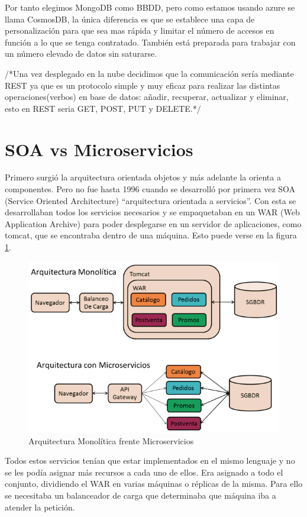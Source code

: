\documentclass[12pt]{report} %
\begin{document}
Por tanto elegimos MongoDB como BBDD, pero como estamos usando azure se llama CosmosDB, la única diferencia es que se establece una capa de personalización para que sea mas rápida y limitar el número de accesos en función a lo que se tenga contratado. También está preparada para trabajar con un número elevado de datos sin saturarse.




/*Una vez desplegado en la nube decidimos que la comunicación sería mediante REST ya que es un protocolo simple y muy eficaz para realizar las distintas operaciones(verbos) en base de datos: añadir, recuperar, actualizar y eliminar, esto en REST seria GET, POST, PUT y DELETE.*/


\section{SOA vs Microservicios}

Primero surgió la arquitectura orientada objetos y más adelante la orienta a componentes. Pero no fue hasta 1996 cuando se desarrolló por primera vez SOA (Service Oriented Architecture) “arquitectura orientada a servicios”. Con esta se desarrollaban todos los servicios necesarios y se empaquetaban en un WAR (Web Application Archive) para poder desplegarse en un servidor de aplicaciones, como tomcat, que se encontraba dentro de una máquina. Esto puede verse en la figura \ref{fig:soavsmicroservicios}.

\begin{figure}
	\centering
	\includegraphics[width=0.7\linewidth]{imagenes/soavsmicroservicios}
	\caption{Arquitectura Monolítica frente Microservicios}
	\label{fig:soavsmicroservicios}
\end{figure}

Todos estos servicios tenían que estar implementados en el mismo lenguaje y no se les podía asignar más recursos a cada uno de ellos. Era asignado a todo el conjunto, dividiendo el WAR en varias máquinas o réplicas de la misma. Para ello se necesitaba un balanceador de carga que determinaba que máquina iba a atender la petición.
\end{document}
